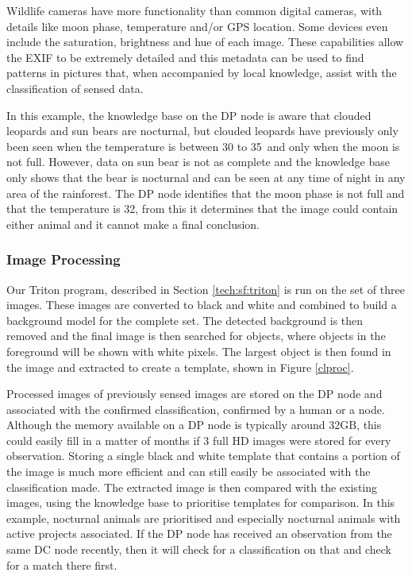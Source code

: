 			Wildlife cameras have more functionality than common digital cameras, with details like moon phase, temperature and/or GPS location. Some devices even include the saturation, brightness and hue of each image. These capabilities allow the EXIF to be extremely detailed and this metadata can be used to find patterns in pictures that, when accompanied by local knowledge, assist with the classification of sensed data. 
			
			In this example, the knowledge base on the DP node is aware that clouded leopards and sun bears are nocturnal, but clouded leopards have previously only been seen when the temperature is between 30 to 35\celsius\ and only when the moon is not full. However, data on sun bear is not as complete and the knowledge base only shows that the bear is nocturnal and can be seen at any time of night in any area of the rainforest. The DP node identifies that the moon phase is not full and that the temperature is 32\celsius, from this it determines that the image could contain either animal and it cannot make a final conclusion.
			
		\subsubsection{Image Processing}
			Our Triton program, described in Section \ref{tech:sf:triton} is run on the set of three images. These images are converted to black and white and combined to build a background model for the complete set. The detected background is then removed and the final image is then searched for objects, where objects in the foreground will be shown with white pixels. The largest object is then found in the image and extracted to create a template, shown in Figure \ref{clproc}.
			
			Processed images of previously sensed images are stored on the DP node and associated with the confirmed classification, confirmed by a human or a node. Although the memory available on a DP node is typically around 32GB, this could easily fill in a matter of months if 3 full HD images were stored for every observation. Storing a single black and white template that contains a portion of the image is much more efficient and can still easily be associated with the classification made. The extracted image is then compared with the existing images, using the knowledge base to prioritise templates for comparison. In this example, nocturnal animals are prioritised and especially nocturnal animals with active projects associated. If the DP node has received an observation from the same DC node recently, then it will check for a classification on that and check for a match there first.

